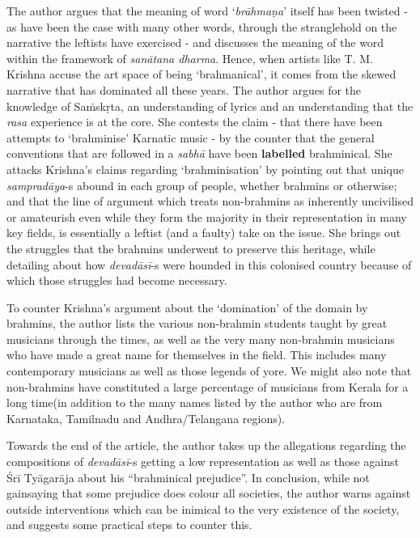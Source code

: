 The author argues that the meaning of word ‘\textit{brāhmaṇa}’ itself has been twisted - as have been the case with many other words, through the stranglehold on the narrative the leftists have exercised - and discusses the meaning of the word within the framework of \textit{sanātana dharma}. Hence, when artists like T. M. Krishna accuse the art space of being ‘brahmanical’, it comes from the skewed narrative that has dominated all these years. The author argues for the knowledge of Saṁskṛta, an understanding of lyrics and an understanding that the \textit{rasa} experience is at the core. She contests the claim - that there have been attempts to ‘brahminise’ Karnatic music - by the counter that the general conventions that are followed in a \textit{sabhā} have been \textbf{labelled} brahminical. She attacks Krishna’s claims regarding ‘brahminisation’ by pointing out that unique \textit{sampradāya}-s abound in each group of people, whether brahmins or otherwise; and that the line of argument which treats non-brahmins as inherently uncivilised or amateurish even while they form the majority in their representation in many key fields, is essentially a leftist (and a faulty) take on the issue. She brings out the struggles that the brahmins underwent to preserve this heritage, while detailing about how \textit{devadāsī}-s were hounded in this colonised country because of which those struggles had become necessary.

To counter Krishna’s argument about the ‘domination’ of the domain by brahmins, the author lists the various non-brahmin students taught by great musicians through the times, as well as the very many non-brahmin musicians who have made a great name for themselves in the field. This includes many contemporary musicians as well as those legends of yore. We might also note that non-brahmins have constituted a large percentage of musicians from Kerala for a long time(in addition to the many names listed by the author who are from Karnataka, Tamilnadu and Andhra/Telangana regions).

Towards the end of the article, the author takes up the allegations regarding the compositions of \textit{devadāsī}-s getting a low representation as well as those against Śrī Tyāgarāja about his “brahminical prejudice”. In conclusion, while not gainsaying that some prejudice does colour all societies, the author warns against outside interventions which can be inimical to the very existence of the society, and suggests some practical steps to counter this.

